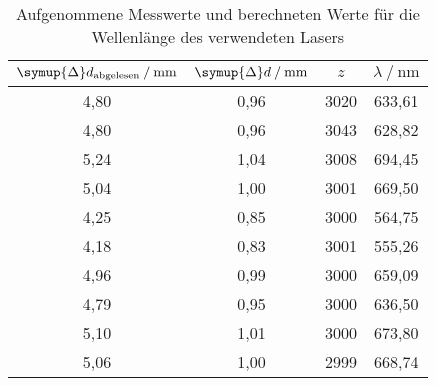 \begin{table}[H]
   \centering
   \caption{Aufgenommene Messwerte und berechneten Werte für die Wellenlänge des verwendeten Lasers}
   \label{tab:lam}
   \begin{tabular} { c c c c }
 \toprule
 {$\symup{\Delta}d_\text{abgelesen}\:/\: \mathrm{mm}$} & {$\symup{\Delta}d\:/\: \mathrm{mm}$} & {$z$} & {$\lambda\:/\: \mathrm{nm}$} \\
    \midrule
    4,80 & 0,96 & 3020 & 633,61 \\
    4,80 & 0,96 & 3043 & 628,82 \\
    5,24 & 1,04 & 3008 & 694,45 \\
    5,04 & 1,00 & 3001 & 669,50 \\
    4,25 & 0,85 & 3000 & 564,75 \\
    4,18 & 0,83 & 3001 & 555,26 \\
    4,96 & 0,99 & 3000 & 659,09 \\
    4,79 & 0,95 & 3000 & 636,50 \\
    5,10 & 1,01 & 3000 & 673,80 \\
    5,06 & 1,00 & 2999 & 668,74 \\
    \bottomrule
  \end{tabular}
\end{table}
